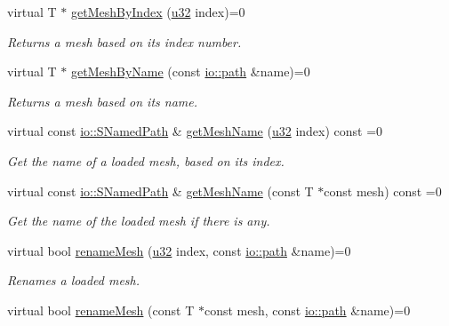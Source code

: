 \begin{DoxyCompactItemize}
virtual T $\ast$ \hyperlink{classirr_1_1scene_1_1IMeshCache_ac4ab47723ac9c9ee81ff553af105bd6e}{get\+Mesh\+By\+Index} (\hyperlink{namespaceirr_a0416a53257075833e7002efd0a18e804}{u32} index)=0
\begin{DoxyCompactList}\small\item\em Returns a mesh based on its index number. \end{DoxyCompactList}\item 
virtual T $\ast$ \hyperlink{classirr_1_1scene_1_1IMeshCache_a6165e3f028c526af9ac094a99881598b}{get\+Mesh\+By\+Name} (const \hyperlink{namespaceirr_1_1io_ab1bdc45edb3f94d8319c02bc0f840ee1}{io\+::path} \&name)=0
\begin{DoxyCompactList}\small\item\em Returns a mesh based on its name. \end{DoxyCompactList}\item 
virtual const \hyperlink{structirr_1_1io_1_1SNamedPath}{io\+::\+S\+Named\+Path} \& \hyperlink{classirr_1_1scene_1_1IMeshCache_ac61e9ae1135743d90cc28266a6cfc236}{get\+Mesh\+Name} (\hyperlink{namespaceirr_a0416a53257075833e7002efd0a18e804}{u32} index) const  =0
\begin{DoxyCompactList}\small\item\em Get the name of a loaded mesh, based on its index. \end{DoxyCompactList}\item 
virtual const \hyperlink{structirr_1_1io_1_1SNamedPath}{io\+::\+S\+Named\+Path} \& \hyperlink{classirr_1_1scene_1_1IMeshCache_a50a1fd8b5e27c14c729b69f8313bb1eb}{get\+Mesh\+Name} (const T $\ast$const mesh) const  =0
\begin{DoxyCompactList}\small\item\em Get the name of the loaded mesh if there is any. \end{DoxyCompactList}\item 
virtual bool \hyperlink{classirr_1_1scene_1_1IMeshCache_a694f606aa09dcdf75d32a2349be2ff3f}{rename\+Mesh} (\hyperlink{namespaceirr_a0416a53257075833e7002efd0a18e804}{u32} index, const \hyperlink{namespaceirr_1_1io_ab1bdc45edb3f94d8319c02bc0f840ee1}{io\+::path} \&name)=0
\begin{DoxyCompactList}\small\item\em Renames a loaded mesh. \end{DoxyCompactList}\item 
virtual bool \hyperlink{classirr_1_1scene_1_1IMeshCache_a18169251ed55f2ea9f2e5341382ab49f}{rename\+Mesh} (const T $\ast$const mesh, const \hyperlink{namespaceirr_1_1io_ab1bdc45edb3f94d8319c02bc0f840ee1}{io\+::path} \&name)=0

\end{DoxyCompactItemize}
